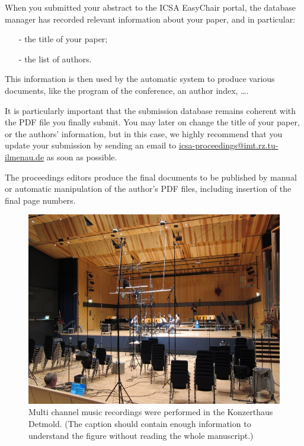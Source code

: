 \documentclass[a4paper, 10pt, twocolumn]{article}
\begin{document}
When you submitted your abstract to the ICSA EasyChair portal, the database manager has recorded relevant information about your paper, and in particular:
\begin{itemize}
	\item[-] the title of your paper;
	\item[-] the list of authors.
\end{itemize}
This information is then used by the automatic system to produce various documents, like the program of the conference, an author index, \ldots.

It is particularly important that the submission database remains coherent with the PDF file you finally submit. You may later on change the title of your paper, or the authors' information, but in this case, we highly recommend that you update your submission by sending an email to \textcolor{blue}{\url{icsa-proceedings@imt.rz.tu-ilmenau.de}} as soon as possible.

The proceedings editors produce the final documents to be published by manual or automatic manipulation of the author's PDF files, including insertion of the final page numbers.


\begin{figure}[hbt]
	\begin{center}
		\includegraphics[width=\columnwidth]{figures/figure1.jpeg}
	\end{center}
	\caption{Multi channel music recordings were performed in the Konzerthaus Detmold. (The caption should contain enough information to understand the figure without reading the whole manuscript.)\label{fig:dode}}
\end{figure}
\end{document}
